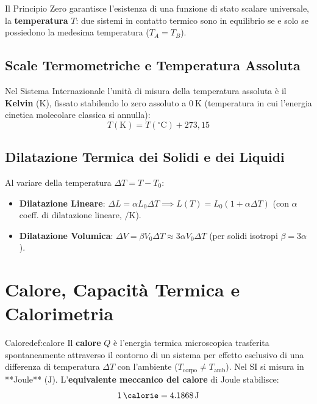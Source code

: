 Il Principio Zero garantisce l'esistenza di una funzione di stato scalare universale, la \textbf{temperatura} $T$: due sistemi in contatto termico sono in equilibrio se e solo se possiedono la medesima temperatura ($T_A = T_B$).

\subsection{Scale Termometriche e Temperatura Assoluta}
Nel Sistema Internazionale l'unità di misura della temperatura assoluta è il \textbf{Kelvin} ($\si{\kelvin}$), fissato stabilendo lo zero assoluto a $\SI{0}{\kelvin}$ (temperatura in cui l'energia cinetica molecolare classica si annulla):
\begin{equation}
    T(\si{\kelvin}) = T(^\circ\text{C}) + 273{,}15
\end{equation}

\subsection{Dilatazione Termica dei Solidi e dei Liquidi}
Al variare della temperatura $\Delta T = T - T_0$:
\begin{itemize}
    \item \textbf{Dilatazione Lineare}: $\Delta L = \alpha L_0 \Delta T \implies L(T) = L_0(1 + \alpha\Delta T)$ (con $\alpha$ coeff. di dilatazione lineare, $\si{\per\kelvin}$).
    \item \textbf{Dilatazione Volumica}: $\Delta V = \beta V_0 \Delta T \approx 3\alpha V_0 \Delta T$ (per solidi isotropi $\beta = 3\alpha$).
\end{itemize}

\section{Calore, Capacità Termica e Calorimetria}
\label{sec:calore_calorimetria}

\begin{definizione}{Calore}{def:calore}
Il \textbf{calore} $Q$ è l'energia termica microscopica trasferita spontaneamente attraverso il contorno di un sistema per effetto esclusivo di una differenza di temperatura $\Delta T$ con l'ambiente ($T_{\text{corpo}} \neq T_{\text{amb}}$).
Nel SI si misura in **Joule** ($\si{\joule}$). L'\textbf{equivalente meccanico del calore} di Joule stabilisce:
\begin{equation}
    \SI{1}{\calorie} = \SI{4.1868}{\joule}
\end{equation}
\end{definizione}

